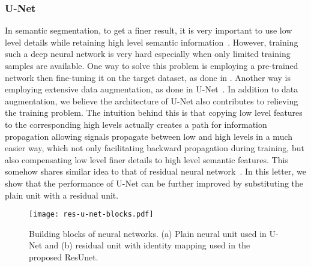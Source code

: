\documentclass[journal]{IEEEtran}
\begin{document}
\subsubsection{U-Net}
In semantic segmentation, to get a finer result, it is very important to use low level details while retaining high level semantic information~\cite{FCN2015fully,U-NET2015}. However, training such a deep neural network is very hard especially when only limited training samples are available. One way to solve this problem is employing a pre-trained network then fine-tuning it on the target dataset, as done in \cite{FCN2015fully}. Another way is employing extensive data augmentation, as done in U-Net~\cite{U-NET2015}. In addition to data augmentation, we believe the architecture of  U-Net also contributes to relieving the training problem. The intuition behind this is that copying low level features to the corresponding high levels actually creates a path for information propagation allowing signals propagate between low and high levels in a much easier way, which not only facilitating backward propagation during training, but also compensating low level finer details to high level semantic features. This somehow shares similar idea to that of residual neural network~\cite{resnet2015deep}. In this letter, we show that the performance of U-Net can be further improved by substituting the plain unit with a residual unit. 
\begin{figure}[t!]
	\begin{center}
		\texttt{[image: res-u-net-blocks.pdf]}
		\caption{Building blocks of neural networks. (a) Plain neural unit used in U-Net and (b) residual unit with identity mapping used in the proposed ResUnet.}
		\label{Fig:ResNet Block}
	\end{center}
	\vspace{-0.6cm}
\end{figure}
\end{document}
